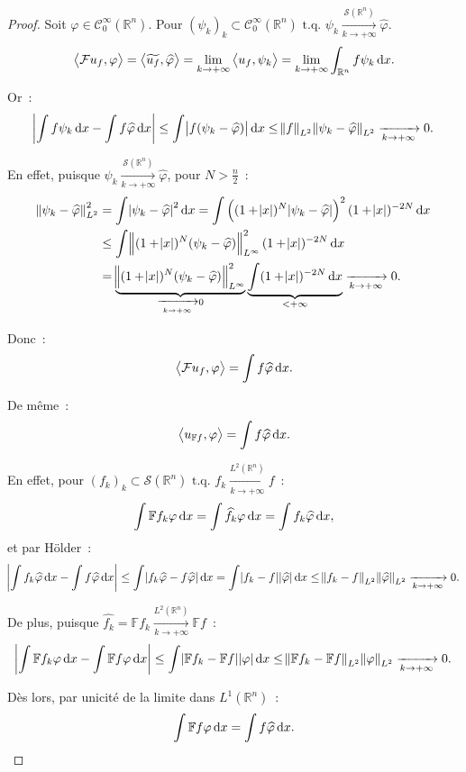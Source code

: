 \documentclass{report}
\newcommand{\R}{{\mathbb R}}
\newcommand{\scpr}[2]{\left\langle#1, #2\right\rangle}
\newcommand{\tq}{\text{ t.q. }}
\newcommand{\st}{\tq}
\newcommand{\pinfty}{{+\infty}}
\theoremstyle{definition}
\theoremstyle{remark}
\begin{document}
\begin{proof} Soit $\varphi \in \mathcal C^\infty_0(\R^n)$. Pour $(\psi_k)_k \subset \mathcal C^\infty_0(\R^n) \st \psi_k \xrightarrow[k \to \pinfty]{\mathcal S(\R^n)} \widehat {\varphi}$.
\[\scpr {\mathcal Fu_f}\varphi = \scpr {\widetilde {u_f}}{\widehat \varphi} = \lim_{k \to \pinfty}\scpr {u_f}{\psi_k} = \lim_{k \to \pinfty}\int_{\R^n}f\psi_k\dif x.\]

Or~:
\[\abs {\int f\psi_k\dif x - \int f\widehat \varphi\dif x} \leq \int\abs {f(\psi_k - \widehat \varphi)}\dif x
	\leq \norm f_{L^2}\norm {\psi_k-\widehat \varphi}_{L^2} \xrightarrow[k \to \pinfty]{} 0.\]

En effet, puisque $\psi_k \xrightarrow[k \to \pinfty]{\mathcal S(\R^n)} \widehat \varphi$, pour $N > \frac n2$~:
\begin{align*}
	\norm {\psi_k - \widehat \varphi}_{L^2}^2 &= \int\abs {\psi_k-\widehat \varphi}^2\dif x = \int\left((1+\abs x)^N\abs {\psi_k-\widehat \varphi}\right)^2(1+\abs x)^{-2N}\dif x \\
	&\leq \int\norm {(1+\abs x)^N(\psi_k-\widehat\varphi)}_{L^\infty}^2(1+\abs x)^{-2N}\dif x \\
	&= \underbrace {\norm {(1+\abs x)^N(\psi_k-\widehat\varphi)}_{L^\infty}^2}_{\xrightarrow[k \to \pinfty]{} 0}\underbrace{\int(1+\abs x)^{-2N}\dif x}_{< \pinfty}
		\xrightarrow[k \to \pinfty]{} 0.
\end{align*}

Donc~:
\[\scpr {\mathcal Fu_f}\varphi = \int f\widehat \varphi\dif x.\]

De même~:
\[\scpr {u_{\mathbb Ff}}\varphi = \int f\widehat \varphi\dif x.\]

En effet, pour $(f_k)_k \subset \mathcal S(\R^n) \st f_k \xrightarrow[k \to \pinfty]{L^2(\R^n)} f$~:
\[\int\mathbb Ff_k\varphi\dif x = \int\widehat {f_k}\varphi\dif x = \int f_k\widehat \varphi\dif x,\]
et par Hölder~:
\[\abs {\int f_k\widehat\varphi\dif x - \int f\widehat\varphi\dif x} \leq \int\abs {f_k\widehat \varphi - f\widehat \varphi}\dif x = \int\abs {f_k-f}\abs{\widehat \varphi}\dif x
\leq \norm {f_k-f}_{L^2}\norm {\widehat \varphi}_{L^2} \xrightarrow[k \to \pinfty]{} 0.\]

De plus, puisque $\widehat {f_k} = \mathbb Ff_k \xrightarrow[k \to \pinfty]{L^2(\R^n)} \mathbb Ff$~:
\[\abs {\int \mathbb Ff_k\varphi\dif x - \int\mathbb Ff\varphi\dif x} \leq \int\abs {\mathbb Ff_k-\mathbb Ff}\abs \varphi\dif x
\leq \norm {\mathbb Ff_k-\mathbb Ff}_{L^2}\norm \varphi_{L^2} \xrightarrow[k \to \pinfty]{} 0.\]

Dès lors, par unicité de la limite dans $L^1(\R^n)$~:
\[\int\mathbb Ff\varphi\dif x = \int f\widehat \varphi\dif x.\]
\end{proof}
\end{document}
